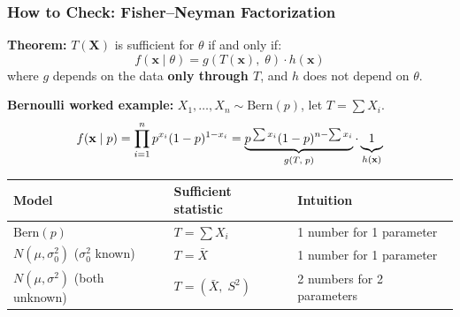\documentclass[aspectratio=169]{beamer}
\begin{document}
\begin{frame}
\frametitle{How to Check: Fisher--Neyman Factorization}

\small
\textbf{Theorem:} $T(\mathbf{X})$ is sufficient for $\theta$ if and only if:
$$f(\mathbf{x} \mid \theta) = g\!\left(T(\mathbf{x}),\; \theta\right) \cdot h(\mathbf{x})$$
where $g$ depends on the data \textbf{only through $T$}, and $h$ does not depend on $\theta$.

\vspace{0.15cm}
\textbf{Bernoulli worked example:} $X_1, \ldots, X_n \sim \text{Bern}(p)$, let $T = \sum X_i$.
$$f(\mathbf{x} \mid p) = \prod_{i=1}^n p^{x_i}(1-p)^{1-x_i} = \underbrace{p^{\,\sum x_i}(1-p)^{n - \sum x_i}}_{g(T,\; p)} \cdot \underbrace{1\vphantom{p^{\sum}}}_{h(\mathbf{x})}$$

\vspace{0.1cm}
\begin{center}
\renewcommand{\arraystretch}{1.5}
\begin{tabular}{lll}
  \textbf{Model} & \textbf{Sufficient statistic} & \textbf{Intuition} \\
  \hline
  $\text{Bern}(p)$ & $T = \sum X_i$ & 1 number for 1 parameter \\
  $N(\mu, \sigma^2_0)$ \;($\sigma^2_0$ known) & $T = \bar{X}$ & 1 number for 1 parameter \\
  $N(\mu, \sigma^2)$ \;(both unknown) & $T = (\bar{X},\; S^2)$ & 2 numbers for 2 parameters \\
  \hline
\end{tabular}
\end{center}
\end{frame}
\end{document}
